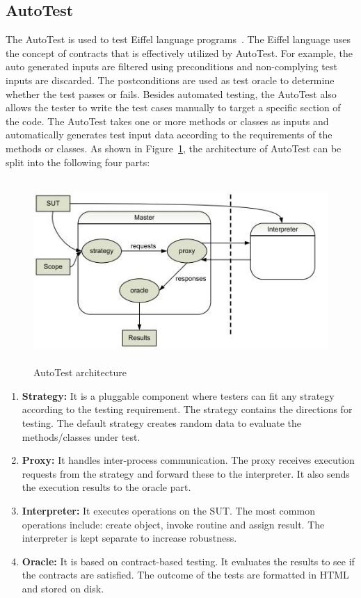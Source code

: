 \subsection{AutoTest} \label{autotest_2}
The AutoTest is used to test Eiffel language programs~\cite{ciupa2007automatic}. The Eiffel language uses the concept of contracts that is effectively utilized by AutoTest. For example, the auto generated inputs are filtered using preconditions and non-complying test inputs are discarded. The postconditions are used as test oracle to determine whether the test passes or fails. Besides automated testing, the AutoTest also allows the tester to write the test cases manually to target a specific section of the code. The AutoTest takes one or more methods or classes as inputs and automatically generates test input data according to the requirements of the methods or classes. As shown in Figure~\ref{fig:autotest}, the architecture of AutoTest can be split into the following four parts:

\begin{figure}[h]
	\centering
	\includegraphics[width=13cm, height=7cm]{chapter2/autotest.png}
	\bigskip
	\caption{AutoTest architecture~\cite{leitner2007reconciling}}
	\label{fig:autotest}
\end{figure}

\begin{enumerate}
\item \textbf{Strategy:} It is a pluggable component where testers can fit any strategy according to the testing requirement. The strategy contains the directions for testing.%
The default strategy creates random data to evaluate the methods/classes under test.
\item \textbf{Proxy:} It handles inter-process communication. The proxy receives execution requests from the strategy and forward these to the interpreter. It also sends the execution results to the oracle part.
\item \textbf{Interpreter:} It executes operations on the SUT. The most common operations include: create object, invoke routine and assign result. The interpreter is kept separate to increase robustness.
\item \textbf{Oracle:} It is based on contract-based testing. It evaluates the results to see if the contracts are satisfied. The outcome of the tests are formatted in HTML and stored on disk.
\end{enumerate}

